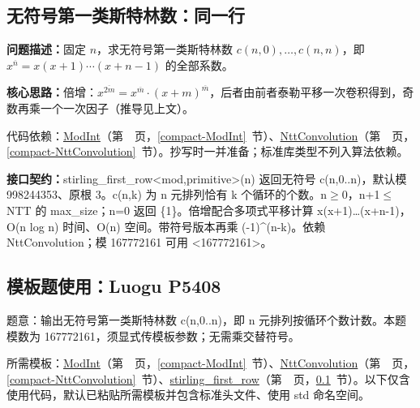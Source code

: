 \Needspace{579pt}

\subsection{无符号第一类斯特林数：同一行}\label{compact-stirling_first_row}

\noindent\textbf{问题描述：}\allowbreak 固定 $n$，求无符号第一类斯特林数 $c(n,0),\dots,c(n,n)$，即 $x^{\overline n}=x(x+1)\cdots(x+n-1)$ 的全部系数。

\textbf{核心思路：}\allowbreak 倍增：$x^{\overline{2m}}=x^{\overline m}\cdot(x+m)^{\overline m}$，后者由前者泰勒平移一次卷积得到，奇数再乘一个一次因子（推导见上文）。

代码依赖：\hyperref[compact-ModInt]{ModInt}（第~\pageref{compact-ModInt}~页，\ref{compact-ModInt}~节）、\hyperref[compact-NttConvolution]{NttConvolution}（第~\pageref{compact-NttConvolution}~页，\ref{compact-NttConvolution}~节）。抄写时一并准备；标准库类型不列入算法依赖。

{\sloppy{}\noindent\textbf{接口契约：}stirling\_first\_row<mod,primitive>(n) 返回无符号 c(n,0..n)，默认模 998244353、原根 3。c(n,k) 为 n 元排列恰有 k 个循环的个数。n$\ge$0，n+1$\le$NTT 的 max\_size；n=0 返回 \{1\}。倍增配合多项式平移计算 x(x+1)…(x+n-1)，O(n log n) 时间、O(n) 空间。带符号版本再乘 (-1)\textasciicircum{}(n-k)。依赖 NttConvolution；模 167772161 可用 <167772161>。\par}



\Needspace{241pt}

\subsection*{模板题使用：Luogu P5408}

\label{usage-example-54}

题意：输出无符号第一类斯特林数 c(n,0..n)，即 n 元排列按循环个数计数。本题模数为 167772161，须显式传模板参数；无需乘交替符号。

所需模板：\hyperref[compact-ModInt]{ModInt}（第~\pageref{compact-ModInt}~页，\ref{compact-ModInt}~节）、\hyperref[compact-NttConvolution]{NttConvolution}（第~\pageref{compact-NttConvolution}~页，\ref{compact-NttConvolution}~节）、\hyperref[compact-stirling_first_row]{stirling\_\allowbreak{}first\_\allowbreak{}row}（第~\pageref{compact-stirling_first_row}~页，\ref{compact-stirling_first_row}~节）。以下仅含使用代码，默认已粘贴所需模板并包含标准头文件、使用 std 命名空间。


